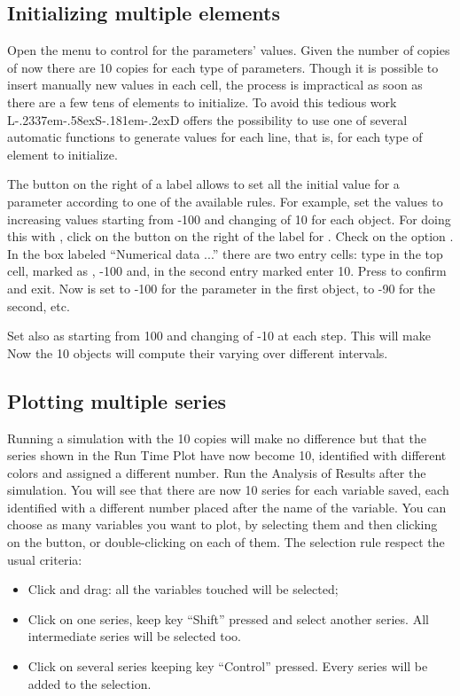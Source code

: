 \documentclass [11pt,a4paper] {book}
\def\LsD{{L\kern-.2337em\lower-.58ex\hbox{S}\kern-.181em\lower-.2ex\hbox{D}}\xspace}
\begin{document}
\subsection{Initializing multiple elements}
Open the menu  to control for
the parameters' values. Given the number of copies of  now there are 10 copies
for each type of parameters. Though it is possible to insert manually new values in each cell, the process is impractical as soon as there are a few tens of elements to initialize. To avoid this tedious work \LsD offers the possibility to use one of several automatic functions to generate values for each line, that is, for each type of element to initialize.

The button  on the right of a label allows to set all the initial value for a
parameter according to one of the available rules. For example, set the 
values to increasing values starting from -100 and changing of 10 for each object. For
doing this with , click on the button on the right of the label for
. Check on the option . In the box labeled ``Numerical data ...'' there are two entry cells: type in the top cell, marked as , -100 and, in the second entry marked  enter 10. Press  to confirm and exit. Now  is set to -100 for the parameter  in the first object, to -90 for the second, etc.

Set also  as starting from 100 and changing of -10 at each step. This will
make  Now the 10 objects  will compute their  varying over different intervals.


\subsection{Plotting multiple series}
Running a simulation with the 10 copies will make no difference but that the series shown
in the Run Time Plot have now become 10, identified with different colors and assigned a
different number. Run the Analysis of Results after the simulation. You will see that there are now 
10 series for each variable saved, each identified with a different
number placed after the name of the variable. You can choose as many variables you want to plot, by selecting them and then clicking on the \lsd{>} button, or double-clicking on each of them. The selection rule respect the usual criteria:
\begin{itemize}
	\item Click and drag: all the variables touched will be selected;
	\item Click on one series, keep key ``Shift'' pressed and select another series. All intermediate series will be selected too.
	\item Click on several series keeping key ``Control'' pressed. Every series will be added to the selection.
\end{itemize}
\end{document}
